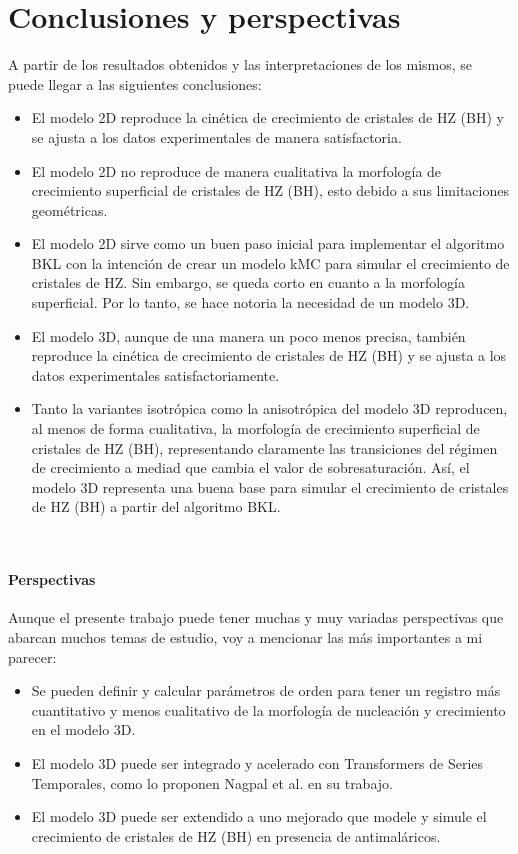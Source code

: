 \documentclass[12pt,letterpaper,oneside]{report}
\begin{document}
\chapter{Conclusiones y perspectivas}
A partir de los resultados obtenidos y las interpretaciones de los mismos, se puede llegar a las siguientes conclusiones:

\begin{itemize}
    \item El modelo 2D reproduce la cinética de crecimiento de cristales de HZ (BH) y se ajusta a los datos experimentales de manera satisfactoria.
    \item El modelo 2D no reproduce de manera cualitativa la morfología de crecimiento superficial de cristales de HZ (BH), esto debido a sus limitaciones geométricas.
    \item El modelo 2D sirve como un buen paso inicial para implementar el algoritmo BKL con la intención de crear un modelo kMC para simular el crecimiento de cristales de HZ. Sin embargo, se queda corto en cuanto a la morfología superficial. Por lo tanto, se hace notoria la necesidad de un modelo 3D.
    \item El modelo 3D, aunque de una manera un poco menos precisa, también reproduce la cinética de crecimiento de cristales de HZ (BH) y se ajusta a los datos experimentales satisfactoriamente.
    \item Tanto la variantes isotrópica como la anisotrópica del modelo 3D reproducen, al menos de forma cualitativa, la morfología de crecimiento superficial de cristales de HZ (BH), representando claramente las transiciones del régimen de crecimiento a mediad que cambia el valor de sobresaturación. Así, el modelo 3D representa una buena base para simular el crecimiento de cristales de HZ (BH) a partir del algoritmo BKL.
\end{itemize}\\

\subsubsection{Perspectivas}

Aunque el presente trabajo puede tener muchas y muy variadas perspectivas que abarcan muchos temas de estudio, voy a mencionar las más importantes a mi parecer:

\begin{itemize}
    \item Se pueden definir y calcular parámetros de orden para tener un registro más cuantitativo y menos cualitativo de la morfología de nucleación y crecimiento en el modelo 3D.
    \item El modelo 3D puede ser integrado y acelerado con Transformers de Series Temporales, como lo proponen Nagpal et al. en su trabajo.
    \item El modelo 3D puede ser extendido a uno mejorado que modele y simule el crecimiento de cristales de HZ (BH) en presencia de antimaláricos.
\end{itemize}
\end{document}
